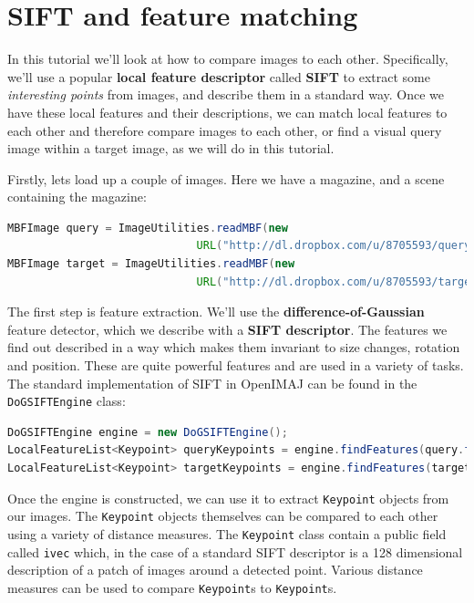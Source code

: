 \documentclass[10pt,a4paper,twoside,extrafontsizes]{memoir}
\begin{document}
\chapter{SIFT and feature matching}
In this tutorial we'll look at how to compare images to each other. Specifically, we'll use a
popular \textbf{local feature descriptor} called \textbf{SIFT} to extract some \emph{interesting points} 
from images, and describe them in a standard way. Once we have these local features and their 
descriptions, we can match local features to each other and therefore compare images to each 
other, or find a visual query image within a target image, as we will do in this tutorial.

Firstly, lets load up a couple of images. Here we have a magazine, and a scene containing the 
magazine:
\begin{lstlisting}[language=java]
MBFImage query = ImageUtilities.readMBF(new 
                             URL("http://dl.dropbox.com/u/8705593/query.jpg"));
MBFImage target = ImageUtilities.readMBF(new 
                             URL("http://dl.dropbox.com/u/8705593/target.jpg"));
\end{lstlisting}
The first step is feature extraction. We'll use the \textbf{difference-of-Gaussian} feature detector, 
which we describe with a \textbf{SIFT descriptor}. The features we find out described in a way which 
makes them invariant to size changes, rotation and position. These are quite powerful features and 
are used in a variety of tasks. The standard implementation of SIFT in OpenIMAJ can be found in the 
\verb+DoGSIFTEngine+ class:
\begin{lstlisting}[language=java]
DoGSIFTEngine engine = new DoGSIFTEngine();	
LocalFeatureList<Keypoint> queryKeypoints = engine.findFeatures(query.flatten());
LocalFeatureList<Keypoint> targetKeypoints = engine.findFeatures(target.flatten());
\end{lstlisting}
Once the engine is constructed, we can use it to extract \verb+Keypoint+ objects from our images. 
The \verb+Keypoint+ objects themselves can be compared to each other using a variety of distance 
measures. The \verb+Keypoint+ class contain a public field called \verb+ivec+ which, in the case
of a standard SIFT descriptor is a 128 dimensional description of a patch of images around a 
detected point. Various distance measures can be used to compare \verb+Keypoint+s to \verb+Keypoint+s.
\end{document}
